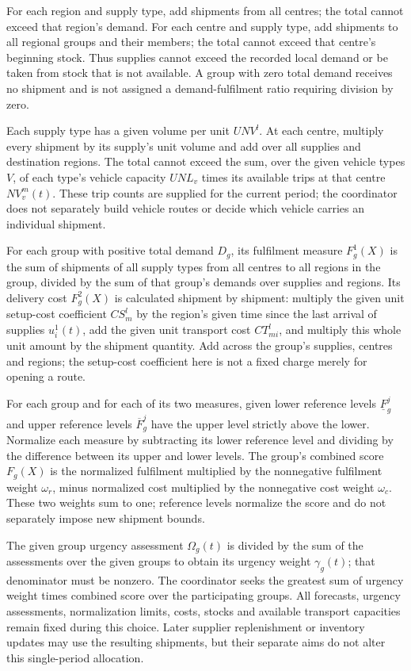 \documentclass[10pt]{article}
\begin{document}
For each region and supply type, add shipments from all centres; the total cannot exceed that region's demand. For each centre and supply type, add shipments to all regional groups and their members; the total cannot exceed that centre's beginning stock. Thus supplies cannot exceed the recorded local demand or be taken from stock that is not available. A group with zero total demand receives no shipment and is not assigned a demand-fulfilment ratio requiring division by zero.

Each supply type has a given volume per unit $UNV^l$. At each centre, multiply every shipment by its supply's unit volume and add over all supplies and destination regions. The total cannot exceed the sum, over the given vehicle types $V$, of each type's vehicle capacity $UNL_v$ times its available trips at that centre $NV_v^m(t)$. These trip counts are supplied for the current period; the coordinator does not separately build vehicle routes or decide which vehicle carries an individual shipment.

For each group with positive total demand $D_g$, its fulfilment measure $F_g^1(X)$ is the sum of shipments of all supply types from all centres to all regions in the group, divided by the sum of that group's demands over supplies and regions. Its delivery cost $F_g^2(X)$ is calculated shipment by shipment: multiply the given unit setup-cost coefficient $CS_m^l$ by the region's given time since the last arrival of supplies $u_i^1(t)$, add the given unit transport cost $CT_{mi}^l$, and multiply this whole unit amount by the shipment quantity. Add across the group's supplies, centres and regions; the setup-cost coefficient here is not a fixed charge merely for opening a route.

For each group and for each of its two measures, given lower reference levels $\underline F_g^j$ and upper reference levels $\overline F_g^j$ have the upper level strictly above the lower. Normalize each measure by subtracting its lower reference level and dividing by the difference between its upper and lower levels. The group's combined score $F_g(X)$ is the normalized fulfilment multiplied by the nonnegative fulfilment weight $\omega_r$, minus normalized cost multiplied by the nonnegative cost weight $\omega_c$. These two weights sum to one; reference levels normalize the score and do not separately impose new shipment bounds.

The given group urgency assessment $\Omega_g(t)$ is divided by the sum of the assessments over the given groups to obtain its urgency weight $\gamma_g(t)$; that denominator must be nonzero. The coordinator seeks the greatest sum of urgency weight times combined score over the participating groups. All forecasts, urgency assessments, normalization limits, costs, stocks and available transport capacities remain fixed during this choice. Later supplier replenishment or inventory updates may use the resulting shipments, but their separate aims do not alter this single-period allocation.
\end{document}
